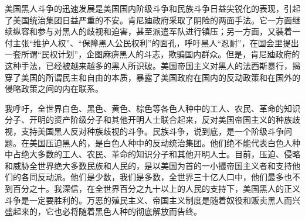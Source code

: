 美国黑人斗争的迅速发展是美国国内阶级斗争和民族斗争日益尖锐化的表现，引起了美国统治集团日益严重的不安。肯尼廸政府采取了阴险的两面手法。它一方面继续纵容和参与对黑人的歧视和迫害，甚至派遣军队进行镇压；另一方面，又装着一付主张“维护人权”、“保障黑人公民权利”的面孔，呼吁黑人“忍耐”，在国会里提出一套所谓“民权计划”，企图麻痹黑人的斗志，欺骗国内群众。但是，肯尼廸政府的这种手法，已经被越来越多的黑人所识破。美国帝国主义对黑人的法西斯暴行，揭穿了美国的所谓民主和自由的本质，暴露了美国政府在国内的反动政策和在国外的侵略政策之间的内在联系。

我呼吁，全世界白色、黑色、黄色、棕色等各色人种中的工人、农民、革命的知识分子、开明的资产阶级分子和其他开明人士联合起来，反对美国帝国主义的种族歧视，支持美国黑人反对种族歧视的斗争。民族斗争，说到底，是一个阶级斗争问题。在美国压迫黑人的，是白色人种中的反动统治集团。他们绝不能代表白色人种中占绝大多数的工人、农民、革命的知识分子和其他开明人士。目前，压迫、侵略和威胁全世界绝大多数民族和人民的，是以美国为首的一小撮帝国主义者和支持他们的各同反动派。他们是少数，我们是多数，全世界三十亿人口中，他们最多也不到百分之十。我深信，在全世界百分之九十以上的人民的支持下，美国黑人的正义斗争是一定要胜利的。万恶的殖民主义、帝国主义制度是随着奴役和贩卖黑人而兴盛起来的，它也必将随着黑色人种的彻底解放而告终。



